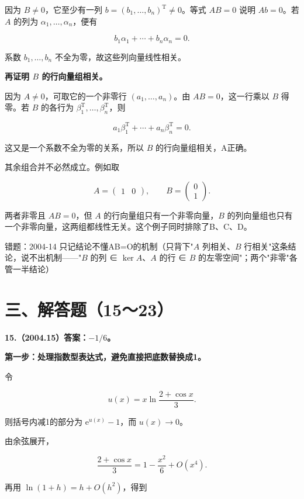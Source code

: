 \documentclass[UTF8,11pt,fontset=windows]{ctexart}
\begin{document}
因为 $B\ne0$，它至少有一列 $b=(b_1,\ldots,b_n)^{\mathrm T}\ne0$。等式 $AB=0$ 说明 $Ab=0$。若 $A$ 的列为 $\alpha_1,\ldots,\alpha_n$，便有

$$
b_1\alpha_1+\cdots+b_n\alpha_n=0.
$$

系数 $b_1,\ldots,b_n$ 不全为零，故这些列向量线性相关。

\textbf{再证明 $B$ 的行向量组相关。}

因为 $A\ne0$，可取它的一个非零行 $(a_1,\ldots,a_n)$。由 $AB=0$，这一行乘以 $B$ 得零。若 $B$ 的各行为 $\beta_1^{\mathrm T},\ldots,\beta_n^{\mathrm T}$，则

$$
a_1\beta_1^{\mathrm T}+\cdots+a_n\beta_n^{\mathrm T}=0.
$$

这又是一个系数不全为零的关系，所以 $B$ 的行向量组相关，A正确。

其余组合并不必然成立。例如取

$$
A=\begin{pmatrix}1&0\end{pmatrix},\qquad
B=\begin{pmatrix}0\\1\end{pmatrix}.
$$

两者非零且 $AB=0$，但 $A$ 的行向量组只有一个非零向量，$B$ 的列向量组也只有一个非零向量，这两组都线性无关。这个例子同时排除了B、C、D。

\begingroup\color{gray}错题：2004-14 只记结论不懂AB=O的机制（只背下"$A$ 列相关、$B$ 行相关"这条结论，说不出机制——"$B$ 的列 ∈ $\ker A$、$A$ 的行 ∈ $B$ 的左零空间"；两个"非零"各管一半结论）\par\endgroup

\clearpage

\section*{三、解答题（15～23）}

\textbf{15.（2004.15）答案：$-1/6$。}

\textbf{第一步：处理指数型表达式，避免直接把底数替换成1。}

令

$$
u(x)=x\ln\frac{2+\cos x}{3}.
$$

则括号内减1的部分为 $\mathrm e^{u(x)}-1$，而 $u(x)\to0$。

由余弦展开，

$$
\frac{2+\cos x}{3}=1-\frac{x^2}{6}+O(x^4).
$$

再用 $\ln(1+h)=h+O(h^2)$，得到
\end{document}
